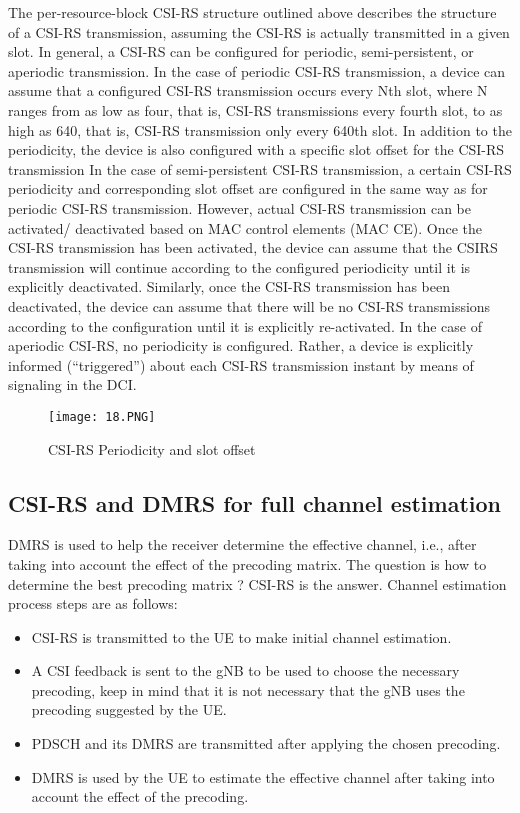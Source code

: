 The per-resource-block CSI-RS structure outlined above describes the structure of a CSI-RS transmission, assuming the CSI-RS is actually transmitted in a given slot. In general, a CSI-RS can be configured for periodic, semi-persistent, or aperiodic transmission.
\newline
In the case of periodic CSI-RS transmission, a device can assume that a configured CSI-RS transmission occurs every Nth slot, where N ranges from as low as four, that is, CSI-RS transmissions every fourth slot, to as high as 640, that is, CSI-RS transmission only every 640th slot. In addition to the periodicity, the device is also configured with a specific slot offset for the CSI-RS transmission
\newline
In the case of semi-persistent CSI-RS transmission, a certain CSI-RS periodicity and corresponding slot offset are configured in the same way as for periodic CSI-RS transmission. However, actual CSI-RS transmission can be activated/ deactivated based on MAC control elements (MAC CE). Once the CSI-RS transmission has been activated, the device can assume that the CSIRS transmission will continue according to the configured periodicity until it is explicitly deactivated. Similarly, once the CSI-RS transmission has been deactivated, the device can assume that there will be no CSI-RS transmissions according to the configuration until it is explicitly re-activated.
\newline
In the case of aperiodic CSI-RS, no periodicity is configured. Rather, a device is explicitly informed (“triggered”) about each CSI-RS transmission instant by means of signaling in the DCI.


\begin{figure}[h]
\centering
\texttt{[image: 18.PNG]}
\caption{CSI-RS Periodicity and slot offset }
\end{figure}

\subsection{CSI-RS and DMRS for full channel estimation}
DMRS is used to help the receiver determine the effective channel, i.e., after taking into account the effect of the precoding matrix.
\newline
The question is how to determine the best precoding matrix ? CSI-RS is the answer.
Channel estimation process steps are as follows:
\begin{itemize}
    \item CSI-RS is transmitted to the UE to make initial channel estimation.
    \item A CSI feedback is sent to the gNB to be used to choose the necessary precoding, keep in mind that it is not necessary that the gNB uses the precoding suggested by the UE.
    \item PDSCH and its DMRS are transmitted after applying the chosen precoding.
    \item DMRS is used by the UE to estimate the effective channel after taking into account the effect of the precoding.
\end{itemize}


